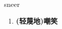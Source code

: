 
\begin{frame}
{\huge sneer}
\begin{center}
\begin{enumerate}\Large
  \item \textbf{(轻蔑地)嘲笑}
\end{enumerate}
\end{center}
\end{frame}
